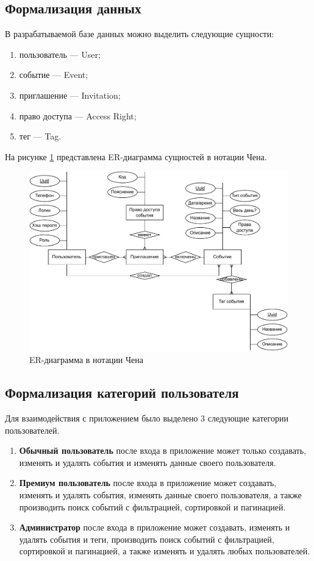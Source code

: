 \subsection{Формализация данных}

В разрабатываемой базе данных можно выделить следующие сущности:

\begin{enumerate}[label=\arabic*.]
	\item пользователь --- User;
	\item событие --- Event;
	\item приглашение --- Invitation;
	\item право доступа --- Access Right;
	\item тег --- Tag.
\end{enumerate}

На рисунке \ref{fig:ER} представлена ER-диаграмма сущностей в нотации Чена.

\begin{figure}[ht!]
	\centering
	\includegraphics[width=0.9\linewidth]{assets/images/ER.pdf}
	\caption{ER-диаграмма в нотации Чена}
	\label{fig:ER}
\end{figure}
\FloatBarrier

\subsection{Формализация категорий пользователя}

Для взаимодействия с приложением было выделено 3 следующие категории пользователей.
\begin{enumerate}[label=\arabic*.]
	\item \textbf{Обычный пользователь} после входа в приложение может только создавать, изменять и удалять события и изменять данные своего пользователя.
	\item \textbf{Премиум пользователь} после входа в приложение может создавать, изменять и удалять события, изменять данные своего пользователя, а также производить поиск событий с фильтрацией, сортировкой и пагинацией.
	\item \textbf{Администратор} после входа в приложение может создавать, изменять и удалять события и теги, производить поиск событий с фильтрацией, сортировкой и пагинацией, а также изменять и удалять любых пользователей.
\end{enumerate}

